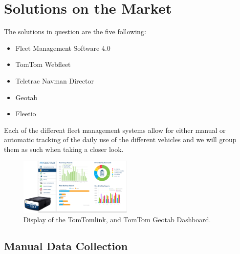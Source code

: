 \section{Solutions on the Market}
The solutions in question are the five following:
\begin{itemize}
    \item Fleet Management Software 4.0
    \item TomTom Webfleet
    \item Teletrac Navman Director
    \item Geotab
    \item Fleetio
\end{itemize}
Each of the different fleet management systems allow for either manual or automatic tracking of the daily use of the different vehicles and we will group them as such when taking a closer look.

\begin{figure}[h!]
    \centering
    \includegraphics[width=0.5\textwidth]{img/Geotab_device_dashboard.png}
    \caption{Display of the TomTomlink, and TomTom Geotab Dashboard.}
    \label{fig:TomTom_TomTomlink_GeotabDashboard}
\end{figure}

\subsection{Manual Data Collection}


